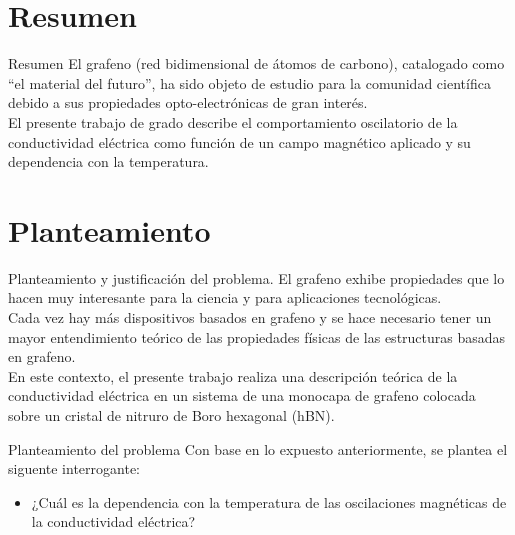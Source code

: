 \section{Resumen}
		\begin{frame}{Resumen}
		\justifying
			El grafeno (red bidimensional de átomos de carbono), catalogado como “el material del futuro”, ha sido objeto de estudio para la comunidad cient\'ifica debido a sus propiedades opto-electrónicas de gran inter\'es.\\
			\vspace{0.5cm}
			El presente trabajo de grado describe el comportamiento oscilatorio de la conductividad el\'ectrica como funci\'on de un campo magnético aplicado
			y su dependencia con la temperatura.
		\end{frame}

	\section{Planteamiento}
		\begin{frame}{Planteamiento y justificación del problema.}
			\justifying
			El grafeno exhibe propiedades que lo hacen muy interesante para la ciencia y para aplicaciones tecnológicas.\\
			Cada vez hay más dispositivos basados en grafeno y se hace necesario tener un mayor entendimiento teórico
			de las propiedades físicas de las estructuras basadas en grafeno.\\
			\vspace{0.5cm}
			En este contexto, el presente trabajo realiza una descripción teórica de la conductividad eléctrica
			en un sistema de una monocapa de grafeno colocada sobre un cristal de nitruro de Boro hexagonal (hBN).
		\end{frame}

		\begin{frame}{Planteamiento del problema}
			\justifying
			Con base en lo expuesto anteriormente, se plantea el siguente interrogante:
			\begin{itemize}
				\item ¿Cuál es la dependencia con la temperatura de las oscilaciones magnéticas de la conductividad eléctrica?
			\end{itemize}
		\end{frame}


